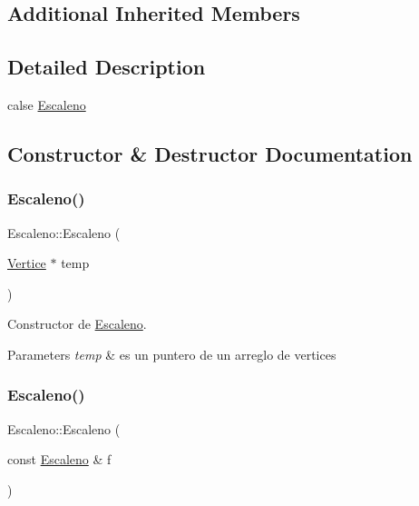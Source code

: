 \subsection*{Additional Inherited Members}


\subsection{Detailed Description}
calse \hyperlink{class_escaleno}{Escaleno} 

\subsection{Constructor \& Destructor Documentation}
\mbox{\label{class_escaleno_a2670875a1c4940661ea68fb97a8e2da1}} 
\subsubsection{\texorpdfstring{Escaleno()}{Escaleno()}\hspace{0.1cm}{\footnotesize\ttfamily [1/2]}}
{\footnotesize\ttfamily Escaleno\+::\+Escaleno (\begin{DoxyParamCaption}\item[{\hyperlink{class_vertice}{Vertice} $\ast$}]{temp }\end{DoxyParamCaption})}



Constructor de \hyperlink{class_escaleno}{Escaleno}. 


\begin{DoxyParams}{Parameters}
{\em temp} & es un puntero de un arreglo de vertices \\
\hline
\end{DoxyParams}
\mbox{\label{class_escaleno_a533113f78f16d04e821724f1ae373a19}} 
\subsubsection{\texorpdfstring{Escaleno()}{Escaleno()}\hspace{0.1cm}{\footnotesize\ttfamily [2/2]}}
{\footnotesize\ttfamily Escaleno\+::\+Escaleno (\begin{DoxyParamCaption}\item[{const \hyperlink{class_escaleno}{Escaleno} \&}]{f }\end{DoxyParamCaption})}



